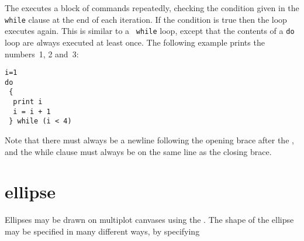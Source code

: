 The  executes a block of commands repeatedly, checking the
condition given in the {\tt while} clause at the end of each iteration.  If the
condition is true then the loop executes again. This is similar to a {\tt
while} loop, except that the contents of a {\tt do} loop are {\emph always}
executed at least once.  The following example prints the numbers~1, 2 and~3:

\begin{verbatim}
i=1
do
 {
  print i
  i = i + 1
 } while (i < 4)
\end{verbatim}

\noindent Note that there must always be a newline following the opening brace
after the , and the while clause must always be on the same line as
the closing brace.


\section{ellipse}

Ellipses may be drawn on multiplot canvases using the . The shape
of the ellipse may be specified in many different ways, by specifying


